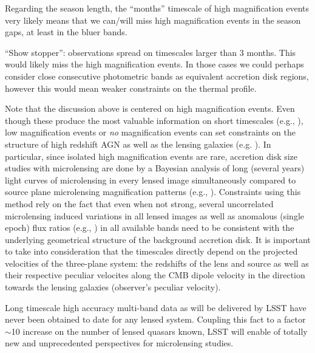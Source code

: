 Regarding the season length, the ``months'' timescale of high
magnification events very likely means that we can/will miss high
magnification events in the season gaps, at least in the bluer bands.

``Show stopper'': observations spread on timescales larger than 3 months.
This would likely miss the high magnification events. In those cases
we could perhaps consider close consecutive photometric bands as
equivalent accretion disk regions, however this would mean weaker
constraints on the thermal profile.

Note that the discussion above is centered on high magnification events. Even
though these produce the most valuable information on short timescales (e.g., \citealt{Anguita2008, eigenbrod2008}), low magnification events or
\emph{no} magnification events can set constraints on the structure of high
redshift AGN as well as the lensing galaxies (e.g. \citealt{gilmerino2005}). In particular, since isolated high magnification events are rare, accretion disk size studies with microlensing are done by a Bayesian analysis of long (several years) light curves of microlensing in every lensed image simultaneously compared to source plane microlensing magnification patterns (e.g., \citealt{kochanek2004,blackburne2014}). Constraints using this method rely on the fact that even when not strong, several uncorrelated microlensing induced variations in all lensed images as well as anomalous (single epoch) flux ratios (e.g., \citealt{bate2008,rojas2014}) in all available bands need to be consistent with the underlying geometrical structure of the background accretion disk. It is important to take into consideration that the timescales directly depend on the projected velocities of the three-plane system: the redshifts of the lens
and source as well as their respective peculiar velocites along the CMB dipole velocity in the direction towards the lensing galaxies (observer's peculiar velocity).

Long timescale high accuracy multi-band data as will be delivered by
LSST have never been obtained to date for any lensed system. Coupling this fact
to a factor $\sim$10 increase on the number of lensed quasars known, LSST will
enable of totally new and unprecedented perspectives for microlensing studies.

%

